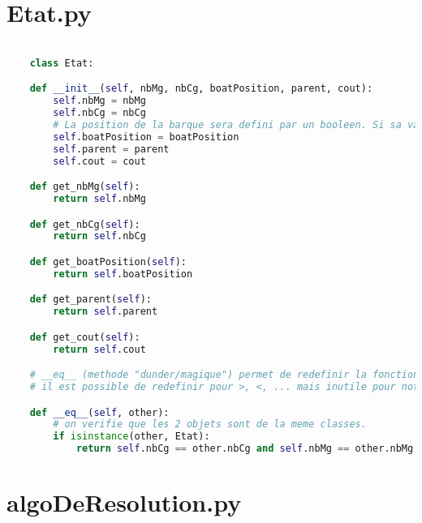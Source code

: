 \documentclass[a4paper, 12pt, french,oneside]{book}
\begin{document}
\section{Etat.py}
\begin{lstlisting}[language=Python, caption=Python example] 

    class Etat:

    def __init__(self, nbMg, nbCg, boatPosition, parent, cout):
        self.nbMg = nbMg
        self.nbCg = nbCg
        # La position de la barque sera defini par un booleen. Si sa valeur est egale a vraie alors la barque est a guache sinon elle est a droite
        self.boatPosition = boatPosition
        self.parent = parent
        self.cout = cout

    def get_nbMg(self):
        return self.nbMg

    def get_nbCg(self):
        return self.nbCg

    def get_boatPosition(self):
        return self.boatPosition

    def get_parent(self):
        return self.parent

    def get_cout(self):
        return self.cout

    # __eq__ (methode "dunder/magique") permet de redefinir la fonction ==. Cela nous sera utile pour verifie si 2 etats sont egaux. (fonctionne avec .remove() pour la comparaison d'etat)
    # il est possible de redefinir pour >, <, ... mais inutile pour notre cas.

    def __eq__(self, other):
        # on verifie que les 2 objets sont de la meme classes.
        if isinstance(other, Etat):
            return self.nbCg == other.nbCg and self.nbMg == other.nbMg and self.boatPosition == other.boatPosition
\end{lstlisting}

\section{algoDeResolution.py}
\end{document}
